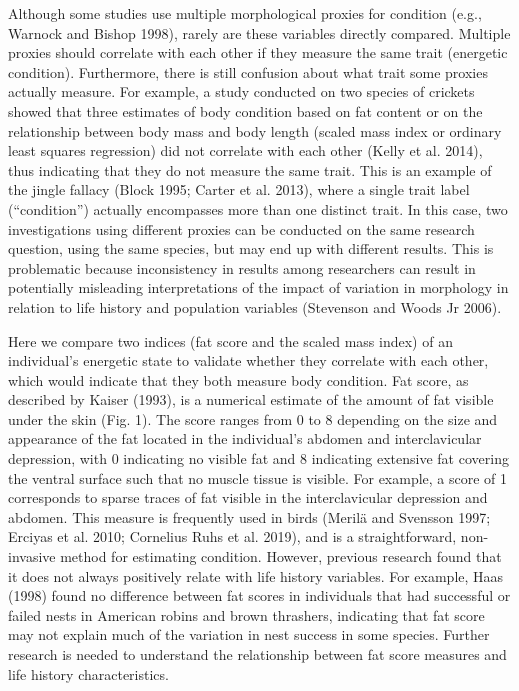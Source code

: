 \documentclass[
]{article}
\begin{document}
Although some studies use multiple morphological proxies for condition
(e.g., Warnock and Bishop 1998), rarely are these variables directly
compared. Multiple proxies should correlate with each other if they
measure the same trait (energetic condition). Furthermore, there is
still confusion about what trait some proxies actually measure. For
example, a study conducted on two species of crickets showed that three
estimates of body condition based on fat content or on the relationship
between body mass and body length (scaled mass index or ordinary least
squares regression) did not correlate with each other (Kelly et al.
2014), thus indicating that they do not measure the same trait. This is
an example of the jingle fallacy (Block 1995; Carter et al. 2013), where
a single trait label (``condition'') actually encompasses more than one
distinct trait. In this case, two investigations using different proxies
can be conducted on the same research question, using the same species,
but may end up with different results. This is problematic because
inconsistency in results among researchers can result in potentially
misleading interpretations of the impact of variation in morphology in
relation to life history and population variables (Stevenson and Woods
Jr 2006).

Here we compare two indices (fat score and the scaled mass index) of an
individual's energetic state to validate whether they correlate with
each other, which would indicate that they both measure body condition.
Fat score, as described by Kaiser (1993), is a numerical estimate of the
amount of fat visible under the skin (Fig. 1). The score ranges from 0
to 8 depending on the size and appearance of the fat located in the
individual's abdomen and interclavicular depression, with 0 indicating
no visible fat and 8 indicating extensive fat covering the ventral
surface such that no muscle tissue is visible. For example, a score of 1
corresponds to sparse traces of fat visible in the interclavicular
depression and abdomen. This measure is frequently used in birds (Merilä
and Svensson 1997; Erciyas et al. 2010; Cornelius Ruhs et al. 2019), and
is a straightforward, non-invasive method for estimating condition.
However, previous research found that it does not always positively
relate with life history variables. For example, Haas (1998) found no
difference between fat scores in individuals that had successful or
failed nests in American robins and brown thrashers, indicating that fat
score may not explain much of the variation in nest success in some
species. Further research is needed to understand the relationship
between fat score measures and life history characteristics.
\end{document}

